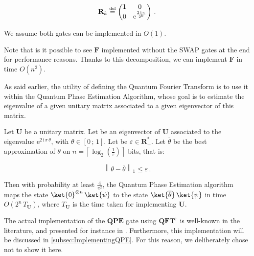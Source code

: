 \documentclass[11pt, a4paper]{article}
\begin{document}
\begin{definition}
                    \[\mathbf{R}_k\overset{\text{\tiny{def}}}{=}\begin{pmatrix}1 & 0\\0 & \mathrm{e}^{\frac{2\,\mathrm{i}\,\pi}{2^k}}\end{pmatrix}\,.\]
                    
                    We assume both gates can be implemented in \(O(1)\).
                    
                    Note that is it possible to see \(\mathbf{F}\) implemented without the SWAP gates at the end for performance reasons. Thanks to this decomposition, we can implement \(\mathbf{F}\) in time \(O\left(n^2\right)\).
                \end{definition}
                
                As said earlier, the utility of defining the Quantum Fourier Transform is to use it within the Quantum Phase Estimation Algorithm, whose goal is to estimate the eigenvalue of a given unitary matrix associated to a given eigenvector of this matrix.
                
                \begin{definition}
                    Let \(\mathbf{U}\) be a unitary matrix. Let \ket{\psi} be an eigenvector of \(\mathbf{U}\) associated to the eigenvalue \(\mathrm{e}^{2\,\mathrm{i}\,\pi\,\theta}\), with \(\theta\in[0\,;\,1]\). Let be \(\varepsilon\in\mathbf{R}_+^*\). Let \(\overline{\theta}\) be the best approximation of \(\theta\) on \(n=\left\lceil\log_2(\frac1\varepsilon)\right\rceil\) bits, that is:
                    
                    \[\left\|\theta-\overline{\theta}\right\|_1\leqslant\varepsilon\,.\]
                    
                    Then with probability at least \(\frac{4}{\pi^2}\), the Quantum Phase Estimation algorithm maps the state \(\ket{0}^{\otimes n}\,\ket{\psi}\) to the state \(\ket{\overline{\theta}}\,\ket{\psi}\) in time \(O\left(2^n\,T_\mathbf{U}\right)\), where \(T_{\mathbf{U}}\) is the time taken for implementing \(\mathbf{U}\).
                    
                    The actual implementation of the \(\mathbf{QPE}\) gate using \(\mathbf{QFT}^\dagger\) is well-known in the literature, and presented for instance in \cite{QPE}. Furthermore, this implementation will be discussed in \autoref{subsec:ImplementingQPE}. For this reason, we deliberately chose not to show it here.
                \end{definition}
\end{document}
